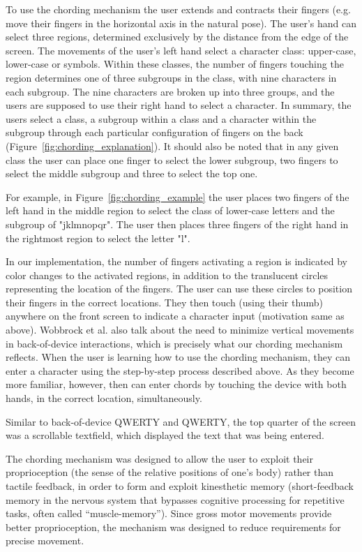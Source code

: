 To use the chording mechanism the user extends and contracts their fingers (e.g. move their fingers in the horizontal axis in the natural pose). The user's hand can select three regions, determined exclusively by the distance from the edge of the screen. The movements of the user's left hand select a character class: upper-case, lower-case or symbols. Within these classes, the number of fingers touching the region determines one of three subgroups in the class, with nine characters in each subgroup. The nine characters are broken up into three groups, and the users are supposed to use their right hand to select a character. In summary, the users select a class, a subgroup within a class and a character within the subgroup through each particular configuration of fingers on the back (Figure~\ref{fig:chording_explanation}). It should also be noted that in any given class the user can place one finger to select the lower subgroup, two fingers to select the middle subgroup and three to select the top one.

For example, in Figure~\ref{fig:chording_example} the user places two fingers of the left hand in the middle region to select the class of lower-case letters and the subgroup of "jklmnopqr". The user then places three fingers of the right hand in the rightmost region to select the letter "l".

In our implementation, the number of fingers activating a region is indicated by color changes to the activated regions, in addition to the translucent circles representing the location of the fingers. The user can use these circles to position their fingers in the correct locations. They then touch (using their thumb) anywhere on the front screen to indicate a character input (motivation same as above). Wobbrock et al. \cite{Wobbrock} also talk about the need to minimize vertical movements in back-of-device interactions, which is precisely what our chording mechanism reflects. When the user is learning how to use the chording mechanism, they can enter a character using the step-by-step process described above.  As they become more familiar, however, then can enter chords by touching the device with both hands, in the correct location, simultaneously.

Similar to back-of-device QWERTY and QWERTY, the top quarter of the screen was a scrollable textfield, which displayed the text that was being entered.

The chording mechanism was designed to allow the user to exploit their proprioception (the sense of the relative positions of one's body) rather than tactile feedback, in order to form and exploit kinesthetic memory (short-feedback memory in the nervous system that bypasses cognitive processing for repetitive tasks, often called ``muscle-memory''). Since gross motor movements provide better proprioception, the mechanism was designed to reduce requirements for precise movement.


